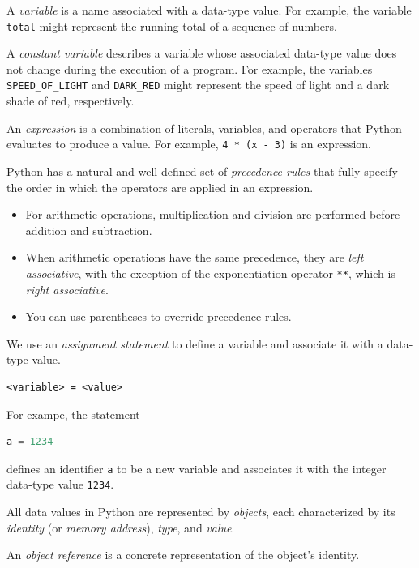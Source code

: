 \documentclass[8pt,a4paper,compress,handout]{beamer}
\begin{document}
\begin{frame}[fragile]
A \emph{variable} is a name associated with a data-type value. For example, the variable \lstinline{total} might represent the running total of a sequence of numbers.

\bigskip

A \emph{constant variable} describes a variable whose associated data-type value does not change during the execution of a program. For example, the variables \lstinline{SPEED_OF_LIGHT} and \lstinline{DARK_RED} might represent the speed of light and a dark shade of red, respectively.

\bigskip

An \emph{expression} is a combination of literals, variables, and operators that Python evaluates to produce a value. For example, \lstinline{4 * (x - 3)} is an expression.

\bigskip

Python has a natural and well-defined set of \emph{precedence rules} that fully specify the order in which the operators are applied in an expression. 
\begin{itemize}
\item For arithmetic operations, multiplication and division are performed before addition and subtraction. 

\item When arithmetic operations have the same precedence, they are \emph{left associative}, with the exception of the exponentiation operator \lstinline{**}, which is \emph{right associative}.

\item You can use parentheses to override precedence rules. 
\end{itemize} 
\end{frame}

\begin{frame}[fragile]
We use an \emph{assignment statement} to define a variable and associate it with a data-type value.
\begin{lstlisting}[language={}]
<variable> = <value>
\end{lstlisting}
For exampe, the statement 
\begin{lstlisting}[language=Python]
a = 1234
\end{lstlisting}
defines an identifier \lstinline{a} to be a new variable and associates it with the integer data-type value \lstinline{1234}.

\bigskip

All data values in Python are represented by \emph{objects}, each characterized by its \emph{identity} (or \emph{memory address}), \emph{type}, and \emph{value}.

\bigskip

An \emph{object reference} is a concrete representation of the object's identity.
\end{frame}
\end{document}
